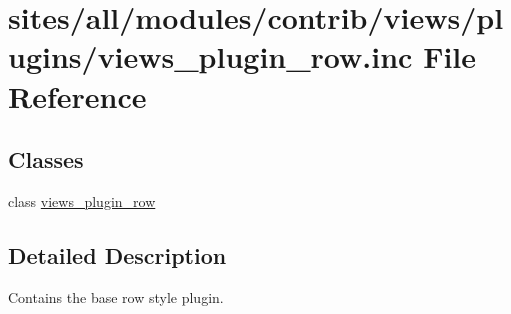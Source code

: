 \hypertarget{views__plugin__row_8inc}{
\section{sites/all/modules/contrib/views/plugins/views\_\-plugin\_\-row.inc File Reference}
\label{views__plugin__row_8inc}
}
\subsection*{Classes}
\begin{CompactItemize}
\item 
class \hyperlink{classviews__plugin__row}{views\_\-plugin\_\-row}
\end{CompactItemize}


\subsection{Detailed Description}
Contains the base row style plugin. 